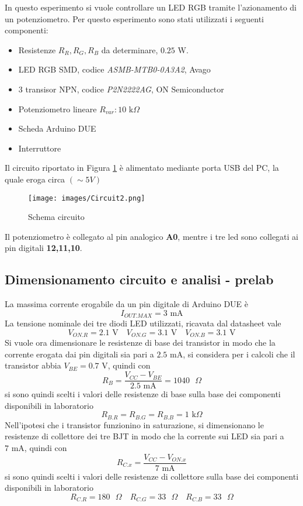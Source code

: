 In questo esperimento si vuole controllare un LED RGB tramite l'azionamento di un potenziometro. Per questo esperimento sono stati utilizzati i seguenti componenti:
\begin{itemize}
    \item Resistenze $R_R,R_G,R_B$ da determinare, $0.25$ W. 
    \item LED RGB SMD, codice \textit{ASMB-MTB0-0A3A2}, Avago
    \item 3 transisor NPN, codice \textit{P2N2222AG}, ON Semiconductor
    \item Potenziometro lineare $R_{var}:10\text{ k}\Omega$
    \item Scheda Arduino DUE
    \item Interruttore
\end{itemize}
Il circuito riportato in Figura \ref{fig:Circuit2} è alimentato mediante porta USB del PC, la quale eroga circa $(\sim 5 V)$
\begin{figure}[H]
    \centering
    \texttt{[image: images/Circuit2.png]}
    \caption{Schema circuito}
    \label{fig:Circuit2}
\end{figure}
\noindent Il potenziometro è collegato al pin analogico \textbf{A0}, mentre i tre led sono collegati ai pin digitali \textbf{12,11,10}.
\subsection{Dimensionamento circuito e analisi - prelab}
La massima corrente erogabile da un pin digitale di Arduino DUE è 
\begin{equation*}
    I_{OUT.MAX}=3\text{ mA}
\end{equation*}
La tensione nominale dei tre diodi LED utilizzati, ricavata dal datasheet vale
\begin{equation*}
    V_{ON.R}=2.1\text{ V}\quad V_{ON.G}=3.1\text{ V}\quad V_{ON.B}=3.1\text{ V}
\end{equation*}
Si vuole ora dimensionare le resistenze di base dei transistor in modo che la corrente erogata dai pin digitali sia pari a $2.5\text{ mA}$, si considera per i calcoli che il transistor abbia $V_{BE}=0.7\text{ V}$, quindi con 
\begin{equation}
    R_B=\frac{V_{CC}-V_{BE}}{2.5\text{ mA}}=1040\text{ }\Omega
\end{equation}
si sono quindi scelti i valori delle resistenze di base sulla base dei componenti disponibili in laboratorio
\begin{equation*}
    R_{B.R}=R_{B.G}=R_{B.B}=1\text{ k$\Omega$}
\end{equation*}
Nell'ipotesi che i transistor funzionino in saturazione, si dimensionano le resistenze di collettore dei tre BJT in modo che la corrente sui LED sia pari a $7 \text{ mA}$, quindi con 
\begin{equation}
    R_{C.x}=\frac{V_{CC}-V_{ON.x}}{7\text{ mA}}
\end{equation}
si sono quindi scelti i valori delle resistenze di collettore sulla base dei componenti disponibili in laboratorio
\begin{equation*}
    R_{C.R}=180\text{ $\Omega$}\quad R_{C.G}=33\text{ $\Omega$}\quad R_{C.B}=33\text{ $\Omega$}
\end{equation*}
